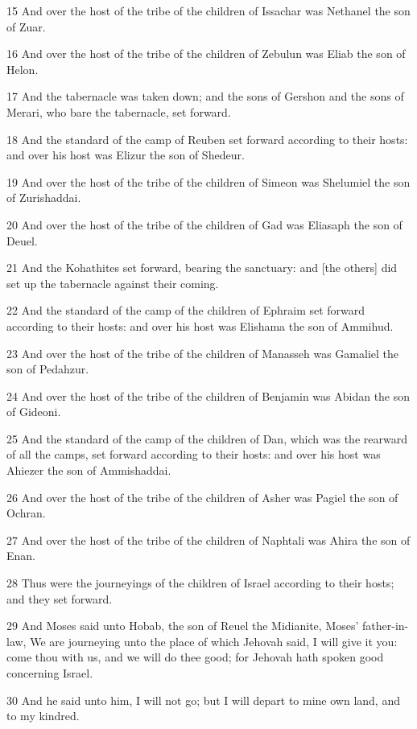 \par 15 And over the host of the tribe of the children of Issachar was Nethanel the son of Zuar.
\par 16 And over the host of the tribe of the children of Zebulun was Eliab the son of Helon.
\par 17 And the tabernacle was taken down; and the sons of Gershon and the sons of Merari, who bare the tabernacle, set forward.
\par 18 And the standard of the camp of Reuben set forward according to their hosts: and over his host was Elizur the son of Shedeur.
\par 19 And over the host of the tribe of the children of Simeon was Shelumiel the son of Zurishaddai.
\par 20 And over the host of the tribe of the children of Gad was Eliasaph the son of Deuel.
\par 21 And the Kohathites set forward, bearing the sanctuary: and [the others] did set up the tabernacle against their coming.
\par 22 And the standard of the camp of the children of Ephraim set forward according to their hosts: and over his host was Elishama the son of Ammihud.
\par 23 And over the host of the tribe of the children of Manasseh was Gamaliel the son of Pedahzur.
\par 24 And over the host of the tribe of the children of Benjamin was Abidan the son of Gideoni.
\par 25 And the standard of the camp of the children of Dan, which was the rearward of all the camps, set forward according to their hosts: and over his host was Ahiezer the son of Ammishaddai.
\par 26 And over the host of the tribe of the children of Asher was Pagiel the son of Ochran.
\par 27 And over the host of the tribe of the children of Naphtali was Ahira the son of Enan.
\par 28 Thus were the journeyings of the children of Israel according to their hosts; and they set forward.
\par 29 And Moses said unto Hobab, the son of Reuel the Midianite, Moses' father-in-law, We are journeying unto the place of which Jehovah said, I will give it you: come thou with us, and we will do thee good; for Jehovah hath spoken good concerning Israel.
\par 30 And he said unto him, I will not go; but I will depart to mine own land, and to my kindred.
